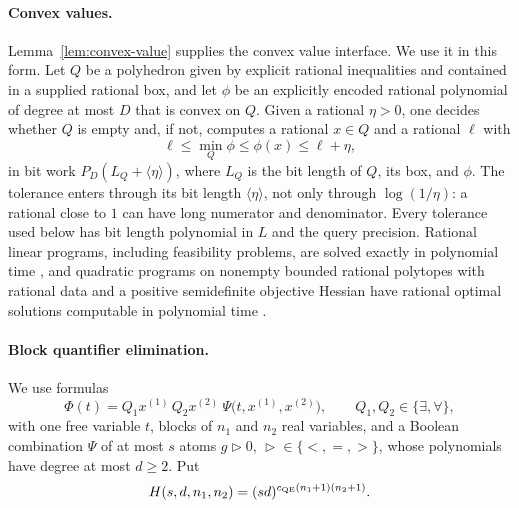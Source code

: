 \paragraph{Convex values.}
Lemma~\ref{lem:convex-value} supplies the convex value interface. We
use it in this form. Let $Q$ be a polyhedron given by explicit rational
inequalities and contained in a supplied rational box, and let $\phi$ be
an explicitly encoded rational polynomial of degree at most $D$ that is
convex on $Q$. Given a rational $\eta>0$, one decides whether $Q$ is
empty and, if not, computes a rational $x\in Q$ and a rational $\ell$
with
\begin{equation}
 \ell\le\min_Q\phi\le\phi(x)\le\ell+\eta,
 \label{eq:recourse-cv}
\end{equation}
in bit work $P_D(L_Q+\langle\eta\rangle)$, where $L_Q$ is the bit length
of $Q$, its box, and $\phi$. The tolerance enters through its bit
length $\langle\eta\rangle$, not only through $\log(1/\eta)$: a rational
close to $1$ can have long numerator and denominator. Every tolerance
used below has bit length polynomial in $L$ and the query precision.
Rational linear programs, including
feasibility problems, are solved exactly in polynomial time
\citep[Theorem~(6.4.12) and Section~6.5]{GroetschelLovaszSchrijver1988},
and quadratic programs on nonempty bounded rational polytopes with
rational data and a positive semidefinite objective Hessian have
rational optimal solutions computable in polynomial time
\citep{KozlovTarasovKhachiyan1980}.

\paragraph{Block quantifier elimination.}
We use formulas
\begin{equation}
 \Phi(t)=Q_1x^{(1)}\,Q_2x^{(2)}\ \Psi\bigl(t,x^{(1)},x^{(2)}\bigr),
 \qquad Q_1,Q_2\in\{\exists,\forall\},
 \label{eq:recourse-two-block}
\end{equation}
with one free variable $t$, blocks of $n_1$ and $n_2$ real variables,
and a Boolean combination $\Psi$ of at most $s$ atoms $g\vartriangleright0$,
$\vartriangleright\in\{<,=,>\}$, whose polynomials have degree at most
$d\ge2$. Put
\begin{equation}
 H(s,d,n_1,n_2)=(sd)^{c_{\rm QE}(n_1+1)(n_2+1)}.
 \label{eq:recourse-H}
\end{equation}

